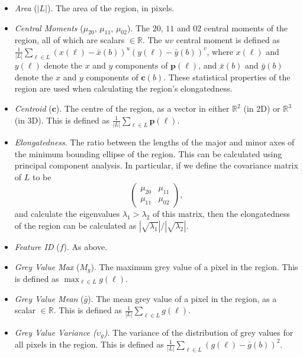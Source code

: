 \begin{itemize}

\item \emph{Area} ($|L|$). The area of the region, in pixels.

\item \emph{Central Moments} ($\mu_{20}$, $\mu_{11}$, $\mu_{02}$). The $20$, $11$ and $02$ central moments of the region, all of which are scalars $\in \mathbb{R}$. The $uv$ central moment is defined as $\displaystyle \frac{1}{|L|} \sum_{\ell \in L} (x(\ell) - \bar{x}(b))^u (y(\ell) - \bar{y}(b))^v$, where $x(\ell)$ and $y(\ell)$ denote the $x$ and $y$ components of $\mathbf{p}(\ell)$, and $\bar{x}(b)$ and $\bar{y}(b)$ denote the $x$ and $y$ components of $\mathbf{c}(b)$. These statistical properties of the region are used when calculating the region's elongatedness.

\item \emph{Centroid} ($\mathbf{c}$). The centre of the region, as a vector in either $\mathbb{R}^2$ (in 2D) or $\mathbb{R}^3$ (in 3D). This is defined as $\displaystyle \frac{1}{|L|} \sum_{\ell \in L} \mathbf{p}(\ell)$.

\item \emph{Elongatedness}. The ratio between the lengths of the major and minor axes of the minimum bounding ellipse of the region. This can be calculated using principal component analysis. In particular, if we define the covariance matrix of $L$ to be
%
\[
\left(
\begin{array}{cc}
\mu_{20} & \mu_{11} \\
\mu_{11} & \mu_{02}
\end{array}
\right),
\]
%
and calculate the eigenvalues $\lambda_1 > \lambda_2$ of this matrix, then the elongatedness of the region can be calculated as $|\sqrt{\lambda_1}| / |\sqrt{\lambda_2}|$.

\item \emph{Feature ID} ($f$). As above.

\item \emph{Grey Value Max} ($M_g$). The maximum grey value of a pixel in the region. This is defined as $\displaystyle \max_{\ell \in L} g(\ell)$.

\item \emph{Grey Value Mean} ($\bar{g}$). The mean grey value of a pixel in the region, as a scalar $\in \mathbb{R}$. This is defined as $\displaystyle \frac{1}{|L|} \sum_{\ell \in L} g(\ell)$.

\item \emph{Grey Value Variance ($\upsilon_g$)}. The variance of the distribution of grey values for all pixels in the region. This is defined as $\displaystyle \frac{1}{|L|} \sum_{\ell \in L} (g(\ell) - \bar{g}(b))^2$.


\end{itemize}
